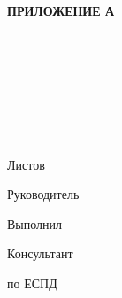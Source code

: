 \begin{ESKDtitlePage}
    \begin{flushright}
        \textbf{ПРИЛОЖЕНИЕ А} \enspace\enspace
    \end{flushright}
    \begin{center}
        \courseworkEdu \\
        \courseworkKaf \\
    \end{center}

    \vfill

    \begin{center}
        \courseworkTopic \\
    \end{center}

    \vfill

    \begin{center}
        \textbf{\courseworkDocTopic} \\
    \end{center}

    \vfill

    \begin{center}
        \courseworkCode \\
        Листов \pageref{LastPage} \\
    \end{center}

    \vfill

    \begin{flushright}
        \begin{minipage}[t]{.49\textwidth}
            \begin{minipage}[t]{.75\textwidth}
                \begin{flushright}
                    Руководитель

                    Выполнил

                    Консультант

                    по ЕСПД
                \end{flushright}
            \end{minipage}
        \end{minipage}
        \begin{minipage}[t]{.49\textwidth}
            \begin{flushright}
                \begin{minipage}[t]{.75\textwidth}
                    \courseworkTeacherName~\courseworkTeacherSurname


\end{minipage}
\end{flushright}
\end{minipage}
\end{flushright}
\end{ESKDtitlePage}

